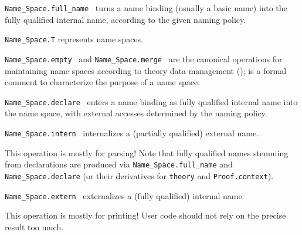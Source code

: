 \begin{isabellebody}
\begin{isamarkuptext}
\begin{description}
  \item \verb|Name_Space.full_name|~ turns a
  name binding (usually a basic name) into the fully qualified
  internal name, according to the given naming policy.

  \item \verb|Name_Space.T| represents name spaces.

  \item \verb|Name_Space.empty|~ and \verb|Name_Space.merge|~ are the canonical operations for
  maintaining name spaces according to theory data management
  ();  is a formal comment
  to characterize the purpose of a name space.

  \item \verb|Name_Space.declare|~ enters a name binding as fully qualified internal name into
  the name space, with external accesses determined by the naming
  policy.

  \item \verb|Name_Space.intern|~ internalizes a
  (partially qualified) external name.

  This operation is mostly for parsing!  Note that fully qualified
  names stemming from declarations are produced via \verb|Name_Space.full_name| and \verb|Name_Space.declare|
  (or their derivatives for \verb|theory| and
  \verb|Proof.context|).

  \item \verb|Name_Space.extern|~ externalizes a
  (fully qualified) internal name.

  This operation is mostly for printing!  User code should not rely on
  the precise result too much.

  \end{description}%
\end{isamarkuptext}%
\isamarkuptrue%
%
\endisatagmlref
{\isafoldmlref}%
%
\isadelimmlref
%
\endisadelimmlref
%
\isadelimtheory
%
\endisadelimtheory
%
\isatagtheory
{}\isamarkupfalse%
%
\endisatagtheory
{\isafoldtheory}%
%
\isadelimtheory
%
\endisadelimtheory
\isanewline
\end{isabellebody}%
